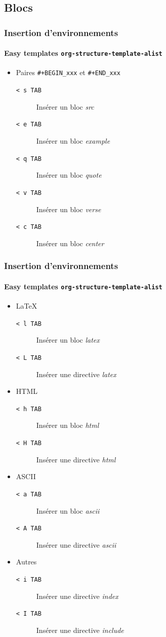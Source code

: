 \documentclass[presentation,t,hideothersubsections]{beamer}
\begin{document}
\subsection{Blocs}
\label{sec-3-8}
\begin{frame}
\frametitle{Insertion d'environnements}
\framesubtitle{Easy templates \texttt{org-structure-template-alist}}
\label{sec-3-8-1}


\begin{itemize}
\item Paires \texttt{\#+BEGIN\_xxx} et \texttt{\#+END\_xxx}
\begin{description}
\item[\texttt{< s TAB}] Insérer un bloc \emph{src}
\item[\texttt{< e TAB}] Insérer un bloc \emph{example}
\item[\texttt{< q TAB}] Insérer un bloc \emph{quote}
\item[\texttt{< v TAB}] Insérer un bloc \emph{verse}
\item[\texttt{< c TAB}] Insérer un bloc \emph{center}
\end{description}
\end{itemize}
\end{frame}
\begin{frame}
\frametitle{Insertion d'environnements}
\framesubtitle{Easy templates \texttt{org-structure-template-alist}}
\label{sec-3-8-2}


\begin{itemize}
\item \LaTeX{}
\begin{description}
\item[\texttt{< l TAB}] Insérer un bloc \emph{latex}
\item[\texttt{< L TAB}] Insérer une directive \emph{latex}
\end{description}
\item HTML
\begin{description}
\item[\texttt{< h TAB}] Insérer un bloc \emph{html}
\item[\texttt{< H TAB}] Insérer une directive \emph{html}
\end{description}
\item ASCII
\begin{description}
\item[\texttt{< a TAB}] Insérer un bloc \emph{ascii}
\item[\texttt{< A TAB}] Insérer une directive \emph{ascii}
\end{description}
\item Autres
\begin{description}
\item[\texttt{< i TAB}] Insérer une directive \emph{index}
\item[\texttt{< I TAB}] Insérer une directive \emph{include}
\end{description}
\end{itemize}
\end{frame}
\end{document}
